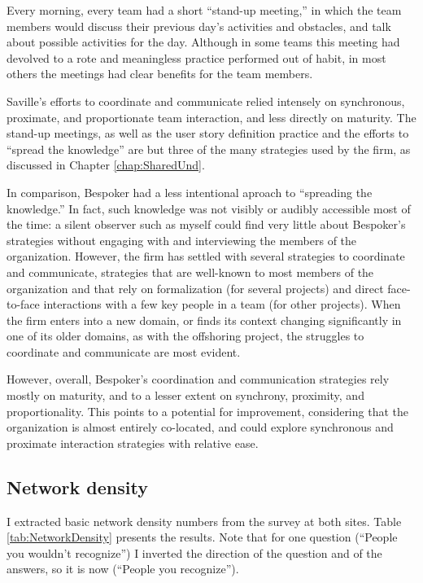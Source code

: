 Every morning, every team had a short ``stand-up meeting,'' in which the team members would discuss their previous day's activities and obstacles, and talk about possible activities for the day. Although in some teams this meeting had devolved to a rote and meaningless practice performed out of habit, in most others the meetings had clear benefits for the team members. 

Saville's efforts to coordinate and communicate relied intensely on synchronous, proximate, and proportionate team interaction, and less directly on maturity. The stand-up meetings, as well as the user story definition practice and the efforts to ``spread the knowledge'' are but three of the many strategies used by the firm, as discussed in Chapter \ref{chap:SharedUnd}.

In comparison, Bespoker had a less intentional aproach to ``spreading the knowledge.'' In fact, such knowledge was not visibly or audibly accessible most of the time: a silent observer such as myself could find very little about Bespoker's strategies without engaging with and interviewing the members of the organization. However, the firm has settled with several strategies to coordinate and communicate, strategies that are well-known to most members of the organization and that rely on formalization (for several projects) and direct face-to-face interactions with a few key people in a team (for other projects). When the firm enters into a new domain, or finds its context changing significantly in one of its older domains, as with the offshoring project, the struggles to coordinate and communicate are most evident.

However, overall, Bespoker's coordination and communication strategies rely mostly on maturity, and to a lesser extent on synchrony, proximity, and proportionality. This points to a potential for improvement, considering that the organization is almost entirely co-located, and could explore synchronous and proximate interaction strategies with relative ease.


\subsection{Network density}
\label{sec:NetworkDensity}

I extracted basic network density numbers from the survey at both sites. Table \ref{tab:NetworkDensity} presents the results. Note that for one question (``People you wouldn't recognize'') I inverted the direction of the question and of the answers, so it is now (``People you recognize'').

